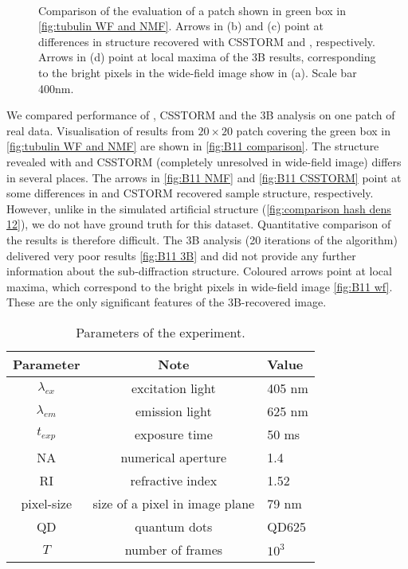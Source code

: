 \begin{figure}[!h]
	\centering
	\newcommand{\sizef}{.95}
	\newcommand{\wf}{.45\textwidth}
	\\
	\caption{Comparison of the evaluation of a patch shown in green box in \autoref{fig:tubulin WF and NMF}. Arrows in (b) and (c) point at differences in structure recovered with CSSTORM and \inmf{}, respectively. Arrows in (d) point at local maxima of the 3B results, corresponding to the bright pixels in the wide-field image show in (a). Scale bar 400\unit{nm}.}
	\label{fig:B11 comparison}
\end{figure}

We compared performance of \inmf{}, CSSTORM and the 3B analysis on one patch of real data. Visualisation of results from $20\times20$ patch covering the green box in \autoref{fig:tubulin WF and NMF} are shown in \autoref{fig:B11 comparison}. The structure revealed with \inmf{} and CSSTORM (completely unresolved in wide-field image) differs in several places. The arrows in \autoref{fig:B11 NMF} and \autoref{fig:B11 CSSTORM}  point at some differences in  \inmf{} and CSTORM recovered sample structure, respectively. However, unlike in the simulated artificial structure (\autoref{fig:comparison hash dens 12}), we do not have ground truth for this dataset. Quantitative comparison of the results is therefore difficult. The 3B analysis (20 iterations of the algorithm) delivered very poor results \autoref{fig:B11 3B} and did not provide any further information about the sub-diffraction structure. Coloured arrows point at local maxima, which correspond to the bright pixels in wide-field image \autoref{fig:B11 wf}. These are the only significant features of the 3B-recovered image.

\begin{table}[!h]	
	\centering
	\begin{tabular}{|c|c|l|}
		\hline 
		\bf Parameter & \bf Note  & \bf Value\tabularnewline
		\hline
		$\lambda_{ex}$ & excitation light & 405 nm\tabularnewline
		$\lambda_{em}$ & emission light & 625 nm\tabularnewline
		$t_{exp}$ & exposure time  & 50 ms\tabularnewline
		NA & numerical aperture & 1.4\tabularnewline
		RI & refractive index & 1.52\tabularnewline
		pixel-size & size of a pixel in image plane & 79 nm\tabularnewline
		QD & quantum dots  & QD625\tabularnewline
		$T$ & number of frames  & $10^{3}$\tabularnewline
		\hline
	\end{tabular}
	\caption{Parameters of the experiment.}\label{tab:Parameters of the (a) simulations (b) real data}
	\label{tab:parameters experiment}
\end{table}

